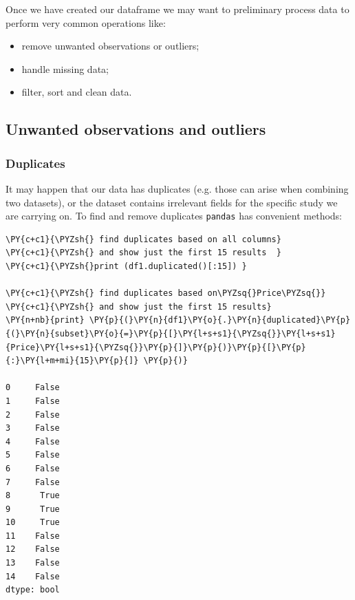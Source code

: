 Once we have created our dataframe we may want to preliminary process data to perform very common operations like:

\begin{itemize}
	\tightlist
\item remove unwanted observations or outliers;
\item handle missing data;
\item filter, sort and clean data.
\end{itemize}

\subsection{Unwanted observations and outliers}

\subsubsection{Duplicates}

It may happen that our data has duplicates (e.g. those can arise when combining two datasets), or the dataset contains irrelevant fields for the specific study we are carrying on. To find and remove duplicates \texttt{pandas} has convenient methods:

\begin{tcolorbox}[breakable, size=fbox, boxrule=1pt, pad at break*=1mm,colback=cellbackground, colframe=cellborder]
\begin{Verbatim}[commandchars=\\\{\}]
\PY{c+c1}{\PYZsh{} find duplicates based on all columns}
\PY{c+c1}{\PYZsh{} and show just the first 15 results  }
\PY{c+c1}{\PYZsh{}print (df1.duplicated()[:15]) }

\PY{c+c1}{\PYZsh{} find duplicates based on\PYZsq{}Price\PYZsq{}}
\PY{c+c1}{\PYZsh{} and show just the first 15 results}
\PY{n+nb}{print} \PY{p}{(}\PY{n}{df1}\PY{o}{.}\PY{n}{duplicated}\PY{p}{(}\PY{n}{subset}\PY{o}{=}\PY{p}{[}\PY{l+s+s1}{\PYZsq{}}\PY{l+s+s1}{Price}\PY{l+s+s1}{\PYZsq{}}\PY{p}{]}\PY{p}{)}\PY{p}{[}\PY{p}{:}\PY{l+m+mi}{15}\PY{p}{]} \PY{p}{)}

0     False
1     False
2     False
3     False
4     False
5     False
6     False
7     False
8      True
9      True
10     True
11    False
12    False
13    False
14    False
dtype: bool
\end{Verbatim}
\end{tcolorbox}


